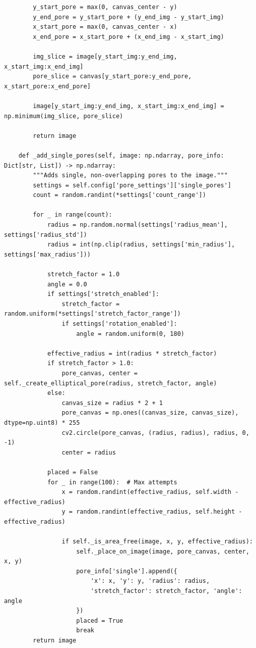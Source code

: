 \documentclass[code]{wordcore}
\begin{document}
\begin{code}
\begin{verbatim}
        y_start_pore = max(0, canvas_center - y)
        y_end_pore = y_start_pore + (y_end_img - y_start_img)
        x_start_pore = max(0, canvas_center - x)
        x_end_pore = x_start_pore + (x_end_img - x_start_img)

        img_slice = image[y_start_img:y_end_img, x_start_img:x_end_img]
        pore_slice = canvas[y_start_pore:y_end_pore, x_start_pore:x_end_pore]
        
        image[y_start_img:y_end_img, x_start_img:x_end_img] = np.minimum(img_slice, pore_slice)

        return image

    def _add_single_pores(self, image: np.ndarray, pore_info: Dict[str, List]) -> np.ndarray:
        """Adds single, non-overlapping pores to the image."""
        settings = self.config['pore_settings']['single_pores']
        count = random.randint(*settings['count_range'])

        for _ in range(count):
            radius = np.random.normal(settings['radius_mean'], settings['radius_std'])
            radius = int(np.clip(radius, settings['min_radius'], settings['max_radius']))

            stretch_factor = 1.0
            angle = 0.0
            if settings['stretch_enabled']:
                stretch_factor = random.uniform(*settings['stretch_factor_range'])
                if settings['rotation_enabled']:
                    angle = random.uniform(0, 180)

            effective_radius = int(radius * stretch_factor)
            if stretch_factor > 1.0:
                pore_canvas, center = self._create_elliptical_pore(radius, stretch_factor, angle)
            else:
                canvas_size = radius * 2 + 1
                pore_canvas = np.ones((canvas_size, canvas_size), dtype=np.uint8) * 255
                cv2.circle(pore_canvas, (radius, radius), radius, 0, -1)
                center = radius

            placed = False
            for _ in range(100):  # Max attempts
                x = random.randint(effective_radius, self.width - effective_radius)
                y = random.randint(effective_radius, self.height - effective_radius)

                if self._is_area_free(image, x, y, effective_radius):
                    self._place_on_image(image, pore_canvas, center, x, y)
                    pore_info['single'].append({
                        'x': x, 'y': y, 'radius': radius,
                        'stretch_factor': stretch_factor, 'angle': angle
                    })
                    placed = True
                    break
        return image


\end{verbatim}
\end{code}
\end{document}

